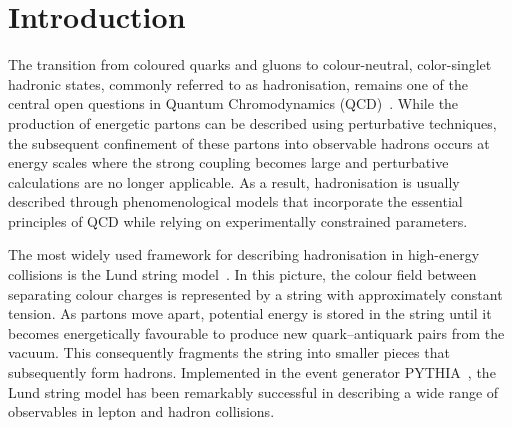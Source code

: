 \section{Introduction}
\label{Sec:Introduction}



The transition from coloured quarks and gluons to colour-neutral, color-singlet hadronic states, commonly referred to as hadronisation, remains one of the central open questions in Quantum Chromodynamics (QCD)~\cite{Andersson:1983ia,Webber:1994zd,Collins:1989gx,Metz:2016swz}. While the production of energetic partons can be described using perturbative techniques, the subsequent confinement of these partons into observable hadrons occurs at energy scales where the strong coupling becomes large and perturbative calculations are no longer applicable. As a result, hadronisation is usually described through phenomenological models that incorporate the essential principles of QCD while relying on experimentally constrained parameters.

The most widely used framework for describing hadronisation in high-energy collisions is the Lund string model~\cite{Andersson:1997xwk,Andersson:2002ap}. In this picture, the colour field between separating colour charges is represented by a string with approximately constant tension. As partons move apart, potential energy is stored in the string until it becomes energetically favourable to produce new quark--antiquark pairs from the vacuum. This consequently fragments the string into smaller pieces that subsequently form hadrons. Implemented in the event generator PYTHIA~\cite{Sjostrand:2014zea}, the Lund string model has been remarkably successful in describing a wide range of observables in lepton and hadron collisions.

